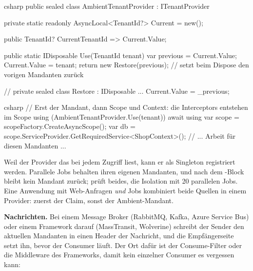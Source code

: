 \begin{sourcecode}{csharp}
public sealed class AmbientTenantProvider : ITenantProvider
{
    private static readonly AsyncLocal<TenantId?> Current = new();

    public TenantId? CurrentTenantId => Current.Value;

    public static IDisposable Use(TenantId tenant)
    {
        var previous = Current.Value;
        Current.Value = tenant;
        return new Restore(previous);     // setzt beim Dispose den vorigen Mandanten zurück
    }

    // private sealed class Restore : IDisposable { ... Current.Value = _previous; }
}
\end{sourcecode}

\begin{sourcecode}{csharp}
// Erst der Mandant, dann Scope und Context: die Interceptors entstehen im Scope
using (AmbientTenantProvider.Use(tenant))
{
    await using var scope = scopeFactory.CreateAsyncScope();
    var db = scope.ServiceProvider.GetRequiredService<ShopContext>();
    // ... Arbeit für diesen Mandanten ...
}
\end{sourcecode}

Weil der Provider das  bei jedem Zugriff liest, kann er als
Singleton registriert werden. Parallele Jobs behalten ihren eigenen Mandanten, und nach dem
-Block bleibt kein Mandant zurück;
 prüft beides, die Isolation mit 20 parallelen Jobs.
Eine Anwendung mit Web-Anfragen \emph{und} Jobs kombiniert beide Quellen in einem Provider:
zuerst der Claim, sonst der Ambient-Mandant.

\textbf{Nachrichten.} Bei einem Message Broker (RabbitMQ, Kafka, Azure Service Bus) oder einem
Framework darauf (MassTransit, Wolverine) schreibt der Sender den aktuellen Mandanten in einen
Header der Nachricht, und die Empfängerseite setzt ihn, bevor der Consumer läuft. Der Ort dafür
ist der Consume-Filter oder die Middleware des Frameworks, damit kein einzelner Consumer es
vergessen kann:

